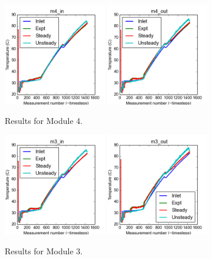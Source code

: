 \documentclass{article}
\begin{document}
\clearpage
\begin{figure}[!ht]
\centering
\includegraphics[width=0.4\textwidth]{../../data/ICSolar/images/Feb28_m4_in_compare.png}\hspace{0.05\textwidth}
\includegraphics[width=0.4\textwidth]{../../data/ICSolar/images/Feb28_m4_out_compare.png}\hspace{0.05\textwidth}\\
\caption{Results for Module 4.}\end{figure}
\begin{figure}[!ht]
\centering
\includegraphics[width=0.4\textwidth]{../../data/ICSolar/images/Feb28_m3_in_compare.png}\hspace{0.05\textwidth}
\includegraphics[width=0.4\textwidth]{../../data/ICSolar/images/Feb28_m3_out_compare.png}\hspace{0.05\textwidth}\\
\caption{Results for Module 3.}\end{figure}
\end{document}
